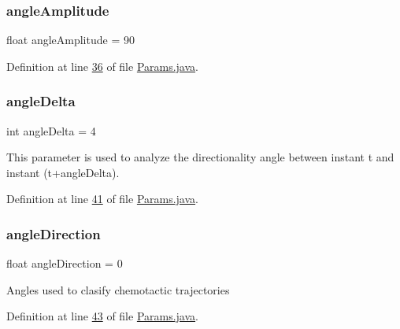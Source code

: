 \subsubsection{\texorpdfstring{angle\+Amplitude}{angleAmplitude}}
{\footnotesize\ttfamily float angle\+Amplitude = 90\hspace{0.3cm}{\ttfamily [static]}}



Definition at line \hyperlink{_params_8java_source_l00036}{36} of file \hyperlink{_params_8java_source}{Params.\+java}.

\hypertarget{classdata_1_1_params_a93caa48162e34b2227a839ed71b4ed44}{}\label{classdata_1_1_params_a93caa48162e34b2227a839ed71b4ed44} 
\subsubsection{\texorpdfstring{angle\+Delta}{angleDelta}}
{\footnotesize\ttfamily int angle\+Delta = 4\hspace{0.3cm}{\ttfamily [static]}}

This parameter is used to analyze the directionality angle between instant t and instant (t+angle\+Delta). 

Definition at line \hyperlink{_params_8java_source_l00041}{41} of file \hyperlink{_params_8java_source}{Params.\+java}.

\hypertarget{classdata_1_1_params_a11ad187f45e1f7add56bde4071bfdf74}{}\label{classdata_1_1_params_a11ad187f45e1f7add56bde4071bfdf74} 
\subsubsection{\texorpdfstring{angle\+Direction}{angleDirection}}
{\footnotesize\ttfamily float angle\+Direction = 0\hspace{0.3cm}{\ttfamily [static]}}

Angles used to clasify chemotactic trajectories 

Definition at line \hyperlink{_params_8java_source_l00043}{43} of file \hyperlink{_params_8java_source}{Params.\+java}.

\hypertarget{classdata_1_1_params_a20fc9eabd567449950e284f07669ec93}{}\label{classdata_1_1_params_a20fc9eabd567449950e284f07669ec93} 
